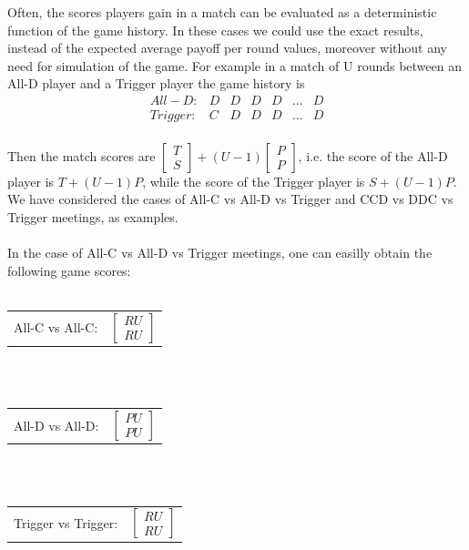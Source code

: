 \documentclass[12pt]{report}
\begin{document}
Often, the scores players gain in a match can be evaluated as a deterministic function of the game history. In these cases we could use the exact results, instead of the expected average payoff per round values, moreover without any need for simulation of the game. For example in a match of U rounds between an All-D player and a Trigger player the game history is 
\\
$$ \begin{matrix}
All-D: & D & D & D & D & ... & D \\
Trigger: & C & D & D & D & ... & D 
\end{matrix}  $$
\\
Then the match scores are  $\begin{bmatrix}
T \\
S 
\end{bmatrix}  +(U-1)\begin{bmatrix}
P \\
P 
\end{bmatrix}$, i.e. the score of the All-D player is $T+(U-1)P$, while the score of the Trigger player is $S+(U-1)P$. We have considered the cases of All-C vs All-D vs Trigger and CCD vs DDC vs Trigger meetings, as examples.
\\\\
In the case of All-C vs All-D vs Trigger meetings, one can easilly obtain the following game scores:
\\\\
\begin{tabular}{c l}
All-C vs All-C: & $\begin{bmatrix}
    RU\\
    RU
\end{bmatrix}$\\
\end{tabular}
\\\\
\begin{tabular}{c l}
All-D vs All-D: & $\begin{bmatrix}
    PU\\
    PU
\end{bmatrix}$\\
\end{tabular}
\\\\
\begin{tabular}{c l}
Trigger vs Trigger: & $\begin{bmatrix}
    RU\\
    RU
\end{bmatrix}$\\
\end{tabular}
\end{document}

